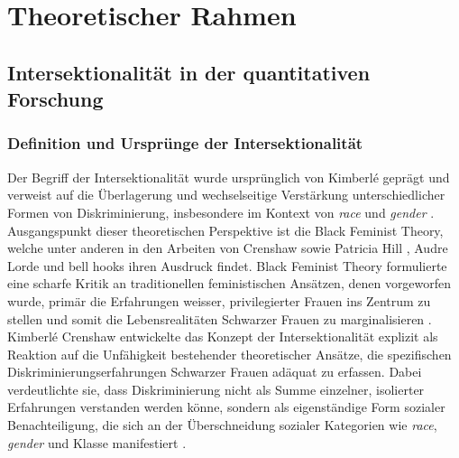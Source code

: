 
\section{Theoretischer Rahmen} \label{sec:theoretischer_rahmen}

\subsection{Intersektionalität in der quantitativen Forschung}

\subsubsection{Definition und Ursprünge der Intersektionalität}

Der Begriff der Intersektionalität wurde ursprünglich von Kimberlé \textcite{crenshawMappingMarginsIntersectionality1991} geprägt und verweist auf die Überlagerung und wechselseitige Verstärkung unterschiedlicher Formen von Diskriminierung, insbesondere im Kontext von \emph{race} und \emph{gender} \parencite{hancockWhenMultiplicationDoesnt2007}. Ausgangspunkt dieser theoretischen Perspektive ist die Black Feminist Theory, welche unter anderen in den Arbeiten von Crenshaw sowie Patricia Hill \textcite{collinsBlackFeministThought2002}, Audre Lorde und bell hooks ihren Ausdruck findet. Black Feminist Theory formulierte eine scharfe Kritik an traditionellen feministischen Ansätzen, denen vorgeworfen wurde, primär die Erfahrungen weisser, privilegierter Frauen ins Zentrum zu stellen und somit die Lebensrealitäten Schwarzer Frauen zu marginalisieren \parencite{collinsBlackFeministThought2002}. Kimberlé Crenshaw entwickelte das Konzept der Intersektionalität explizit als Reaktion auf die Unfähigkeit bestehender theoretischer Ansätze, die spezifischen Diskriminierungserfahrungen Schwarzer Frauen adäquat zu erfassen. Dabei verdeutlichte sie, dass Diskriminierung nicht als Summe einzelner, isolierter Erfahrungen verstanden werden könne, sondern als eigenständige Form sozialer Benachteiligung, die sich an der Überschneidung sozialer Kategorien wie \emph{race}, \emph{gender} und Klasse manifestiert \parencite{crenshawMappingMarginsIntersectionality1991}.

